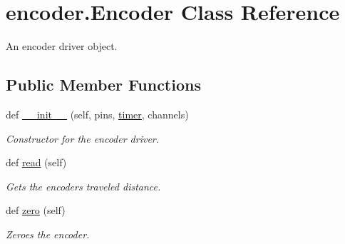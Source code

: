 \hypertarget{classencoder_1_1Encoder}{}\section{encoder.\+Encoder Class Reference}
\label{classencoder_1_1Encoder}


An encoder driver object.  


\subsection*{Public Member Functions}
\begin{DoxyCompactItemize}
\item 
def \mbox{\hyperlink{classencoder_1_1Encoder_a34939827412badc93f8744540676e833}{\+\_\+\+\_\+init\+\_\+\+\_\+}} (self, pins, \mbox{\hyperlink{classencoder_1_1Encoder_a8e9c3e1317abc4f6fbe95468c69223d1}{timer}}, channels)
\begin{DoxyCompactList}\small\item\em Constructor for the encoder driver. \end{DoxyCompactList}\item 
def \mbox{\hyperlink{classencoder_1_1Encoder_aa1c1535160682500f5214f45d8197027}{read}} (self)
\begin{DoxyCompactList}\small\item\em Gets the encoder\textquotesingle{}s traveled distance. \end{DoxyCompactList}\item 
def \mbox{\hyperlink{classencoder_1_1Encoder_ae238ecdbcbce8a193c2e0ffbb4d1dd29}{zero}} (self)
\begin{DoxyCompactList}\small\item\em Zeroes the encoder. \end{DoxyCompactList}\end{DoxyCompactItemize}

